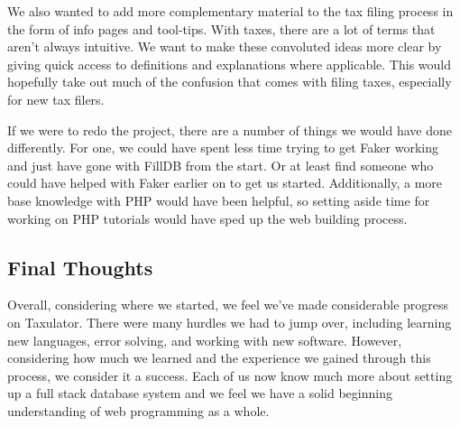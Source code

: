 \documentclass[sigconf]{acmart}
\begin{document}
We also wanted to add more complementary material to the tax filing process in the form of info pages and tool-tips. With taxes, there are a lot of terms that aren't always intuitive. We want to make these convoluted ideas more clear by giving quick access to definitions and explanations where applicable. This would hopefully take out much of the confusion that comes with filing taxes, especially for new tax filers.

If we were to redo the project, there are a number of things we would have done differently. For one, we could have spent less time trying to get Faker working and just have gone with FillDB from the start. Or at least find someone who could have helped with Faker earlier on to get us started. Additionally, a more base knowledge with PHP would have been helpful, so setting aside time for working on PHP tutorials would have sped up the web building process.

\subsection{Final Thoughts}
Overall, considering where we started, we feel we've made considerable progress on Taxulator. There were many hurdles we had to jump over, including learning new languages, error solving, and working with new software. However, considering how much we learned and the experience we gained through this process, we consider it a success. Each of us now know much more about setting up a full stack database system and we feel we have a solid beginning understanding of web programming as a whole.




\end{document}
